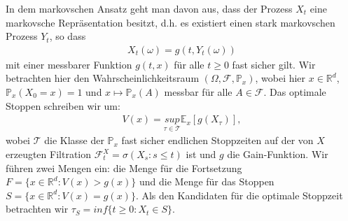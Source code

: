 \documentclass[12pt,titlepage,headsepline]{article}
\begin{document}
    \hfill\break
    In dem markovschen Ansatz geht man davon aus, dass der Prozess $X_t$ eine markovsche Repräsentation besitzt, d.h. es existiert einen stark markovschen Prozess $Y_t$, so dass
    \begin{align*}
      X_t(\omega) = g(t,Y_t(\omega))
    \end{align*}
    mit einer messbarer Funktion $g(t,x)$ für alle $t\geq 0 $ fast sicher gilt.
    Wir betrachten hier den Wahrscheinlichkeitsraum $(\Omega,\mathcal{F},\mathbb{P}_x)$, wobei hier $x \in \mathbb{R}^d$, $\mathbb{P}_x (X_0 = x)=1$ und $x \mapsto \mathbb{P}_x(A)$ messbar für alle $A \in \mathcal{F}$. Das optimale Stoppen schreiben wir um:
    \begin{align*}
      V(x) = \underset{\tau \in \mathcal{T}}{sup} \mathbb{E}_x[g(X_{\tau})],
    \end{align*}
    wobei $\mathcal{T}$ die Klasse der $\mathbb{P}_x$ fast sicher endlichen Stoppzeiten auf der von $X$ erzeugten Filtration $\mathcal{F}_t^X=\sigma(X_s : s \leq t)$ ist und $g$ die Gain-Funktion. Wir führen zwei Mengen ein: die Menge für die Fortsetzung $F = \{x\in \mathbb{R}^d : V(x) > g(x) \}$ und die Menge für das Stoppen $S= \{x\in \mathbb{R}^d : V(x) = g(x) \}$. Als den Kandidaten für die optimale Stoppzeit betrachten wir $\tau_S = inf \{t \geq 0 : X_t \in S\}$.
\end{document}
